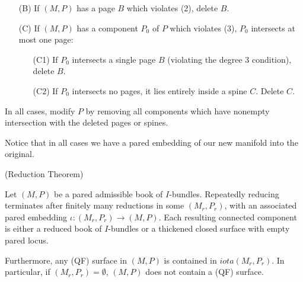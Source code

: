 \begin{defn}
\begin{enumerate}
\item[(B)] If $(M,P)$ has a page $B$ which violates (2), delete $B$.

\item[(C)] If $(M,P)$ has a component $P_0$ of $P$ which violates (3), $P_0$
intersects at most one page:

\begin{enumerate}

\item[(C1)] If $P_0$ intersects a single page $B$ (violating the degree
3 condition), delete $B$.

\item[(C2)] If $P_0$ intersects no pages, it lies entirely inside a spine $C$.
Delete $C$.

\end{enumerate}

\end{enumerate}

In all cases, modify $P$ by removing all components which have nonempty
intersection with the deleted pages or spines.

\end{defn}

Notice that in all cases we have a pared embedding of our new manifold into the
original.

\begin{thm}(Reduction Theorem)

Let $(M,P)$ be a pared admissible book of $I$-bundles. Repeatedly reducing
terminates after finitely many reductions in some $(M_r,P_r)$, with an
associated pared embedding $\iota\colon (M_r,P_r) \to (M,P)$. Each resulting
connected component is either a reduced book of $I$-bundles or a thickened
closed surface with empty pared locus.

Furthermore, any (QF) surface in $(M,P)$ is contained in $iota(M_r,P_r)$. In
particular, if $(M_r,P_r)=\emptyset$, $(M,P)$ does not contain a (QF) surface.

\end{thm}

